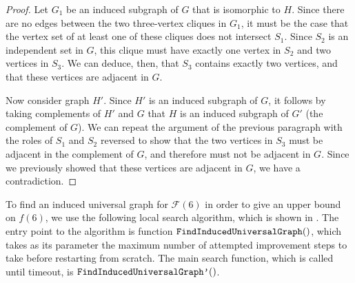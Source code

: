 \documentclass[12pt]{article}
\newcommand{\calF}{\ensuremath{\mathcal{F}}}
\begin{document}
\begin{proof}
    Let $G_1$ be an induced
    subgraph of $G$ that is isomorphic to $H$.  Since there are
    no edges between the two three-vertex cliques in $G_1$, it must be the case that the
    vertex set of at least one of these cliques does not intersect $S_1$.
    Since $S_2$ is an independent set in $G$, this clique must have exactly
    one vertex in $S_2$ and two vertices in $S_3$.  We can deduce, then, that
    $S_3$ contains exactly two vertices, and that these vertices are adjacent in $G$.

    Now consider graph $H'$.  Since $H'$ is an induced subgraph of $G$, it
    follows by taking complements of $H'$ and $G$ that $H$ is an induced
    subgraph of $G'$ (the complement of $G$).  We can repeat the argument
    of the previous paragraph with the roles of $S_1$ and $S_2$ reversed to
    show that the two vertices in $S_3$ must be adjacent in the complement of
    $G$, and therefore must not be adjacent in $G$.  Since we previously showed that
    these vertices are adjacent in $G$, we have a contradiction.
\end{proof}

To find an induced universal graph for $\calF(6)$ in order to give an upper bound
on $f(6)$, we use the following local search
algorithm, which is shown in .
The entry point to the algorithm is function $\FuncSty{FindInducedUniversalGraph}()$,
which takes as its parameter the maximum number of attempted improvement steps to
take before restarting from scratch.  The main search function, which is called
until timeout, is $\FuncSty{FindInducedUniversalGraph'}()$.
\end{document}
